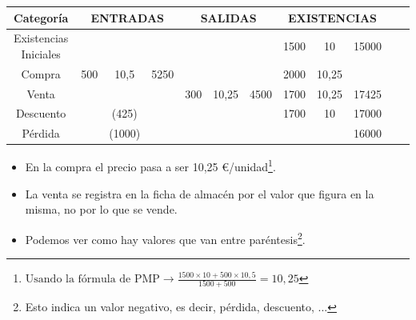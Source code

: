 \documentclass[a4paper,12pt]{article}
\newcommand{\ecuacion}[1]{$#1$}
\begin{document}
\begin{table}[H]
    \centering
    \begin{tabular}{|c|c|c|c|c|c|c|c|c|c|c|c}
        \hline
        \textbf{Categoría}  & \multicolumn{3}{c|}{\textbf{ENTRADAS}} & \multicolumn{3}{c|}{\textbf{SALIDAS}} & \multicolumn{3}{c|}{\textbf{EXISTENCIAS}} \\  \hline
        Existencias Iniciales & & & & & & & 1500 & 10 & 15000\\
        \hline
        Compra & 500 & 10,5 & 5250 & & & & 2000 & 10,25 & \\
        \hline
        Venta & & & & 300 & 10,25 & 4500&1700 &10,25 & 17425\\
        \hline
        Descuento & & (425)& & & & & 1700& 10& 17000\\
        \hline
        Pérdida& & (1000)& & & & & & & 16000\\
        \hline
        
    \end{tabular}    
\end{table}



\begin{itemize}
    \item En la compra el precio pasa a ser 10,25 \euro/unidad\footnote{\ecuacion{\text{Usando la fórmula de PMP} \rightarrow \frac{1500\times10+500\times10,5}{1500+500}=10,25}}.
    \item La venta se registra en la ficha de almacén por el valor que figura en la misma, no por lo que se vende.
    \item Podemos ver como hay valores que van entre paréntesis\footnote{Esto indica un valor negativo, es decir, pérdida, descuento, ...}.
\end{itemize}
\end{document}
